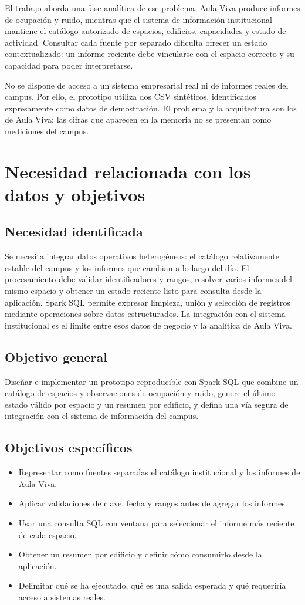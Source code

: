 \documentclass[a4paper,12pt]{article}
\begin{document}
El trabajo aborda una fase analítica de ese problema. Aula Viva produce informes de ocupación y ruido, mientras que el sistema de información institucional mantiene el catálogo autorizado de espacios, edificios, capacidades y estado de actividad. Consultar cada fuente por separado dificulta ofrecer un estado contextualizado: un informe reciente debe vincularse con el espacio correcto y su capacidad para poder interpretarse.

No se dispone de acceso a un sistema empresarial real ni de informes reales del campus. Por ello, el prototipo utiliza dos CSV sintéticos, identificados expresamente como datos de demostración. El problema y la arquitectura son los de Aula Viva; las cifras que aparecen en la memoria no se presentan como mediciones del campus.

\section{Necesidad relacionada con los datos y objetivos}
\subsection{Necesidad identificada}
Se necesita integrar datos operativos heterogéneos: el catálogo relativamente estable del campus y los informes que cambian a lo largo del día. El procesamiento debe validar identificadores y rangos, resolver varios informes del mismo espacio y obtener un estado reciente listo para consulta desde la aplicación. Spark SQL permite expresar limpieza, unión y selección de registros mediante operaciones sobre datos estructurados. La integración con el sistema institucional es el límite entre esos datos de negocio y la analítica de Aula Viva.

\subsection{Objetivo general}
Diseñar e implementar un prototipo reproducible con Spark SQL que combine un catálogo de espacios y observaciones de ocupación y ruido, genere el último estado válido por espacio y un resumen por edificio, y defina una vía segura de integración con el sistema de información del campus.

\subsection{Objetivos específicos}
\begin{itemize}[leftmargin=1.2cm]
  \item Representar como fuentes separadas el catálogo institucional y los informes de Aula Viva.
  \item Aplicar validaciones de clave, fecha y rangos antes de agregar los informes.
  \item Usar una consulta SQL con ventana para seleccionar el informe más reciente de cada espacio.
  \item Obtener un resumen por edificio y definir cómo consumirlo desde la aplicación.
  \item Delimitar qué se ha ejecutado, qué es una salida esperada y qué requeriría acceso a sistemas reales.
\end{itemize}
\end{document}

